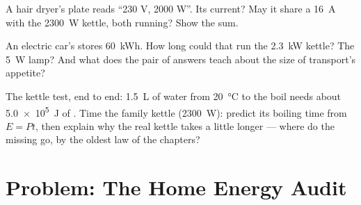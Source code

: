 \begin{exercise}[$\star\star$]\label{exo:g9:electric-power-energy:10}
A hair dryer's plate reads ``230 V, 2000 W''. Its current?
May it share a \qty{16}{A}  with the \qty{2300}{W}
kettle, both running? Show the sum.
\end{exercise}

\begin{exercise}[$\star\star$]\label{exo:g9:electric-power-energy:11}
An electric car's  stores \qty{60}{kWh}. How long
could that run the \qty{2.3}{kW} kettle? The \qty{5}{W}
lamp? And what does the pair of answers teach about the
size of transport's  appetite?
\end{exercise}

\begin{exercise}[$\star\star\star$]\label{exo:g9:electric-power-energy:12}
The kettle test, end to end: \qty{1.5}{L} of water from
\qty{20}{\celsius} to the boil needs about \qty{5.0e5}{J}
of . Time the family kettle (\qty{2300}{W}): predict
its boiling time from $E = P t$, then explain why the real
kettle takes a little longer --- where do the missing
 go, by the oldest law of the  chapters?
\end{exercise}

\section{Problem: The Home Energy Audit}

